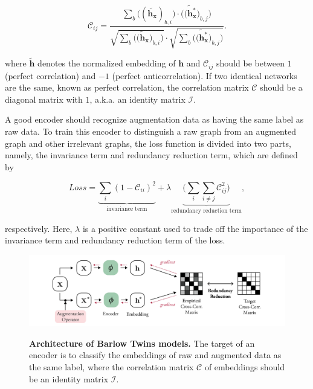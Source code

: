 \begin{equation}
\mathcal{C}_{ij}=\frac{\sum_b\big((\tilde{\textbf{h}_\textbf{x}})_{b,i}\big)\cdot\big(\tilde{(\textbf{h}_\textbf{x}^{*}})_{b,j}\big)}{\sqrt{\sum_b\big(\tilde{(\textbf{h}_\textbf{x}})_{b,i}\big)}\cdot\sqrt{\sum_b\big(\tilde{(\textbf{h}_\textbf{x}^{*}})_{b,j}\big)}}.
\end{equation}

where $\tilde{\textbf{h}}$ denotes the normalized embedding of $\textbf{h}$ and $\mathcal{C}_{ij}$ should be between $1$ (perfect correlation) and $-1$ (perfect anticorrelation). If two identical networks are the same, known as perfect correlation, the correlation matrix $\mathcal{C}$ should be a diagonal matrix with $1$, a.k.a. an identity matrix $\mathcal{I}$. 

A good encoder should recognize augmentation data as having the same label as raw data. To train this encoder to distinguish a raw graph from an augmented graph and other irrelevant graphs, the loss function is divided into two parts, namely, the invariance term and redundancy reduction term, which are defined by

\begin{equation}
\mathit{Loss}=\underbrace{\sum_i(1-\mathcal{C}_{ii})^2}_{\text{invariance term}}+\lambda\underbrace{\Big(\sum_i\sum_{i\neq j}\mathcal{C}_{ij}^2\Big)}_{\text{{redundancy reduction  term}}},
\end{equation}

respectively. Here, $\lambda$ is a positive constant used to trade off the importance of the invariance term and redundancy reduction term of the loss. 

\begin{figure}[!htbp]
{\includegraphics[width=1\textwidth]{./figures/model3_barlowtwins.png}}
\vspace{0.5cm}
\caption[Architecture of Barlow Twins models]{\textbf{Architecture of Barlow Twins models.} The target of an encoder is to classify the embeddings of raw and augmented data as the same label, where the correlation matrix $\mathcal{C}$ of embeddings should be an identity matrix $\mathcal{I}$.}
\label{fig:arch-bt}
\end{figure}


